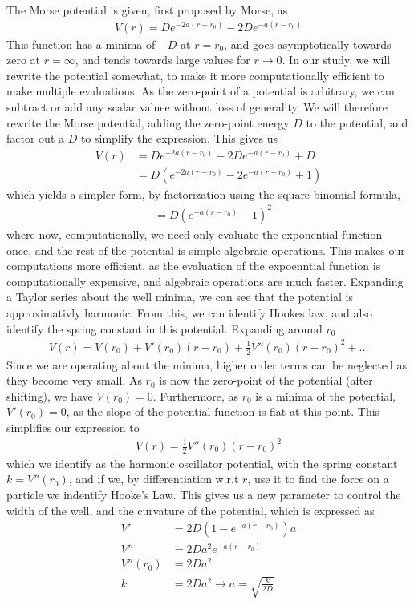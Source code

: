 \documentclass{subfiles}
\begin{document}
The Morse potential is given, first proposed by Morse, as
\begin{align*}
    V(r) = De^{-2a(r-r_0)} - 2De^{-a(r-r_0)}
\end{align*}
This function has a minima of $-D$ at $r = r_0$, and goes asymptotically towards zero at $r=\infty$, and tends towards large values for $r\rightarrow0$. In our study, we will rewrite the potential somewhat, to make it more computationally efficient to make multiple evaluations. As the zero-point of a potential is arbitrary, we can subtract or add any scalar valuee without loss of generality. We will therefore rewrite the Morse potential, adding the zero-point energy $D$ to the potential, and factor out a $D$ to simplify the expression. This gives us
\begin{align*}
    V(r) &= De^{-2a(r-r_0)} - 2De^{-a(r-r_0)} + D \\
    &= D(e^{-2a(r-r_0)} - 2e^{-a(r-r_0)} + 1)
\end{align*}
which yields a simpler form, by factorization using the square binomial formula,
\begin{align}
    &= D(e^{-a(r-r_0)} - 1)^2
\end{align}
where now, computationally, we need only evaluate the exponential function once, and the rest of the potential is simple algebraic operations. This makes our computations more efficient, as the evaluation of the expoenntial function is computationally expensive\cite{sauce?}, and algebraic operations are much faster. Expanding a Taylor series about the well minima, we can see that the potential is approximativly harmonic. From this, we can identify Hookes law, and also identify the spring constant in this potential. Expanding around $r_0$
\begin{align*}
    V(r) = V(r_0) + V'(r_0)(r-r_0) + \frac{1}{2}V''(r_0)(r-r_0)^2 + ...
\end{align*}
Since we are operating about the minima, higher order terms can be neglected as they become very small. As $r_0$ is now the zero-point of the potential (after shifting), we have $V(r_0) = 0$. Furthermore, as $r_0$ is a minima of the potential, $V'(r_0) = 0$, as the slope of the potential function is flat at this point. This simplifies our expression to
\begin{align*}
    V(r) = \frac{1}{2}V''(r_0)(r-r_0)^2
\end{align*}
which we identify as the harmonic oscillator potential, with the spring constant $k = V''(r_0)$, and if we, by differentiation w.r.t $r$, use it to find the force on a particle we indentify Hooke's Law. This gives us a new parameter to control the width of the well, and the curvature of the potential, which is expressed as
\begin{align*}
    V' &= 2D(1 - e^{-a(r-r_0)})a \\
    V'' &= 2Da^2e^{-a(r-r_0)} \\
    V''(r_0) &= 2Da^2 \\
    k &= 2Da^2 \rightarrow a = \sqrt{\frac{k}{2D}}
\end{align*} 
\end{document}

